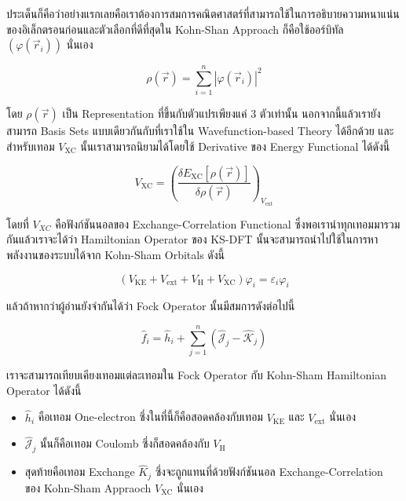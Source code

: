 ประเด็นก็คือว่าอย่างแรกเลยคือเราต้องการสมการคณิตศาสตร์ที่สามารถใช้ในการอธิบายความหนาแน่นของอิเล็กตรอนก่อนและตัวเลือกที่ดีที่สุดใน Kohn-Shan
Approach ก็คือใช้ออร์บิทัล $(\varphi\left(\vec{r}_i\right))$ นั่นเอง

\begin{equation}
    \label{eq:Electron_Density}
    \rho(\vec{r})
    =
    \sum_{i=1}^n
    \left|
    \varphi\left(\vec{r}_i\right)
    \right|^2
\end{equation}

\noindent โดย $\rho(\vec{r})$ เป็น Representation ที่ขึ้นกับตัวแปรเพียงแค่ 3 ตัวเท่านั้น นอกจากนี้แล้วเรายังสามารถ Basis Sets
แบบเดียวกันกับที่เราใช้ใน Wavefunction-based Theory ได้อีกด้วย และสำหรับเทอม $V_{\mathrm{XC}}$ นั้นเราสามารถนิยามได้โดยใช้
Derivative ของ Energy Functional ได้ดังนี้

\begin{equation}
    V_{\mathrm{XC}}
    =
    \left(
    \frac
    {
        \delta E_{\mathrm{XC}}[\rho(\vec{r})]
    }
    {
        \delta \rho(\vec{r})
    }
    \right)_{V_{\mathrm{ext}}}
\end{equation}

\noindent โดยที่ $V_{X C}$ คือฟังก์ชันนอลของ Exchange-Correlation Functional ซึ่งพอเรานำทุกเทอมมารวมกันแล้วเราจะได้ว่า
Hamiltonian Operator ของ KS-DFT นั้นจะสามารถนำไปใช้ในการหาพลังงานของระบบได้จาก Kohn-Sham Orbitals ดังนี้

\begin{equation}
    \label{eq:Kohn_Sham_Equation}
    \left(
    V_{\mathrm{KE}}
    + V_{\mathrm{ext}}
    + V_{\mathrm{H}}
    + V_{\mathrm{XC}}
    \right)
    \varphi_i
    =
    \varepsilon_i \varphi_i
\end{equation}

\noindent แล้วถ้าหากว่าผู้อ่านยังจำกันได้ว่า Fock Operator นั้นมีสมการดังต่อไปนี้

\begin{equation}
    \hat{f}_i
    =
    \hat{h}_i + \sum_{j=1}^n \left(\hat{\mathscr{J}}_j - \hat{\mathscr{K}}_j\right)
\end{equation}

\noindent เราจะสามารถเทียบเคียงเทอมแต่ละเทอมใน Fock Operator กับ Kohn-Sham Hamiltonian Operator ได้ดังนี้

\begin{itemize}
    \item $\hat{h}_i$ คือเทอม One-electron ซึ่งในที่นี้ก็คือสอดคล้องกับเทอม $V_{\mathrm{KE}}$ และ $V_{\mathrm{ext}}$ นั่นเอง

    \item $\hat{\mathcal{J}}_j$ นั้นก็คือเทอม Coulomb ซึ่งก็สอดคล้องกับ $V_{\mathrm{H}}$

    \item สุดท้ายคือเทอม Exchange $\hat{K}_j$ ซึ่งจะถูกแทนที่ด้วยฟังก์ชันนอล Exchange-Correlation ของ Kohn-Sham Appraoch
          $V_{\mathrm{XC}}$ นั่นเอง
\end{itemize}

